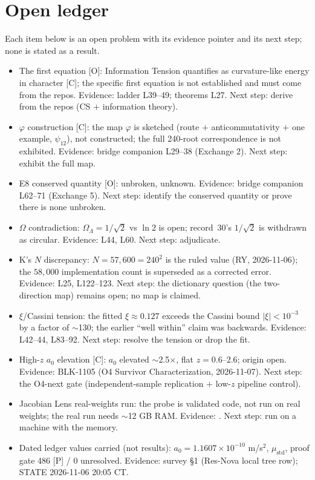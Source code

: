 \documentclass{alienfolio}
\begin{document}
\section{Open ledger}
\label{sec:ledger}
Each item below is an open problem with its evidence pointer and its next step; none is stated as a result.
\begin{itemize}
\item The first equation [O]: Information Tension quantifies as curvature-like energy in character [C]; the specific first equation is not established and must come from the repos. Evidence: ladder L39--49; theorems L27. Next step: derive from the repos (CS $+$ information theory).
\item $\varphi$ construction [C]: the map $\varphi$ is sketched (route $+$ anticommutativity $+$ one example, $\psi_{12}$), not constructed; the full 240-root correspondence is not exhibited. Evidence: bridge companion L29--38 (Exchange 2). Next step: exhibit the full map.
\item E8 conserved quantity [O]: unbroken, unknown. Evidence: bridge companion L62--71 (Exchange 5). Next step: identify the conserved quantity or prove there is none unbroken.
\item $\Omega$ contradiction: $\Omega_\Lambda = 1/\sqrt{2}$ vs $\ln 2$ is open; record~30's $1/\sqrt{2}$ is withdrawn as circular. Evidence:  L44, L60. Next step: adjudicate.
\item K's $N$ discrepancy: $N = 57{,}600 = 240^2$ is the ruled value (RY, 2026-11-06); the $58{,}000$ implementation count is superseded as a corrected error. Evidence:  L25, L122--123. Next step: the dictionary question (the two-direction map) remains open; no map is claimed.
\item $\xi$/Cassini tension: the fitted $\xi \approx 0.127$ exceeds the Cassini bound $|\xi| < 10^{-3}$ by a factor of $\sim$130; the earlier ``well within'' claim was backwards. Evidence:  L42--44, L83--92. Next step: resolve the tension or drop the fit.
\item High-$z$ $a_0$ elevation [C]: $a_0$ elevated $\sim$2.5$\times$, flat $z = 0.6$--$2.6$; origin open. Evidence: BLK-1105 (O4 Survivor Characterization, 2026-11-07). Next step: the O4-next gate (independent-sample replication $+$ low-$z$ pipeline control).
\item Jacobian Lens real-weights run: the probe is validated code, not run on real weights; the real run needs $\sim$12 GB RAM. Evidence: . Next step: run on a machine with the memory.
\item Dated ledger values carried (not results): $a_0 = 1.1607 \times 10^{-10}$ m/s$^2$, $\mu_{\mathrm{std}}$, proof gate 486 [P] / 0 unresolved. Evidence: survey \S1 (Res-Nova local tree row); STATE 2026-11-06 20:05 CT.
\end{itemize}
\end{document}
